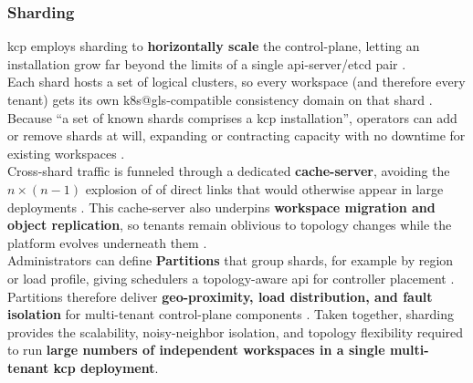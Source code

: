 \documentclass[11pt, a4paper, oneside, listof=totoc]{scrartcl}
\begin{document}
            \subsubsection{Sharding}\label{subsubsec:sharding}
                \gls{kcp} employs sharding to \textbf{horizontally scale} the control-plane, letting
                an installation grow far beyond the limits of a single \gls{api}-server/\gls{etcd}
                pair \parencite{kcpSharding,kcpShardingShards}.
                \\
                Each shard hosts a set of logical clusters, so every workspace (and therefore every
                tenant) gets its own \gls{k8s@gls}-compatible consistency domain on that shard
                \parencite{kcpShardingShards}.
                Because \enquote{a set of known shards comprises a \gls{kcp} installation},
                operators can add or remove shards at will, expanding or contracting capacity with
                no downtime for existing workspaces \parencite{kcpShardingShards}.
                \\
                Cross-shard traffic is funneled through a dedicated \textbf{cache-server}, avoiding
                the \( n \times (n - 1) \) explosion of of direct links that would otherwise appear
                in large deployments \parencite{kcpShardingCacheServer}.
                This cache-server also underpins \textbf{workspace migration and object
                replication}, so tenants remain oblivious to topology changes while the platform
                evolves underneath them \parencite{kcpShardingCacheServer}.
                \\
                Administrators can define \textbf{Partitions} that group shards, for example by
                region or load profile, giving schedulers a topology-aware \gls{api} for controller
                placement \parencite{kcpShardingPartitions}.
                Partitions therefore deliver \textbf{geo-proximity, load distribution, and fault
                isolation} for multi-tenant control-plane components
                \parencite{kcpShardingPartitions}.
                Taken together, sharding provides the scalability, noisy-neighbor isolation, and
                topology flexibility required to run \textbf{large numbers of independent workspaces
                in a single multi-tenant \gls{kcp} deployment}.
\end{document}
